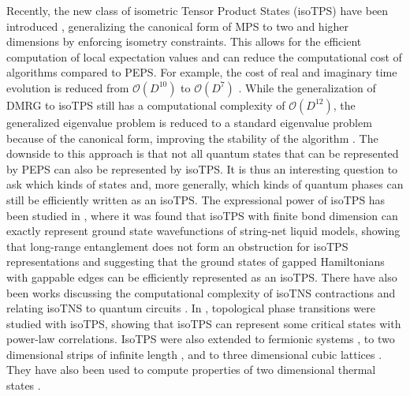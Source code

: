 Recently, the new class of isometric Tensor Product States (isoTPS) have been introduced \cite{cite:isometric_tensor_network_states_in_two_dimensions, cite:conversion_of_PEPS_into_a_canonical_form, cite:DMRG_approach_to_optimizing_2D_tensor_networks}, generalizing the canonical form of MPS to two and higher dimensions by enforcing isometry constraints. This allows for the efficient computation of local expectation values and can reduce the computational cost of algorithms compared to PEPS. For example, the cost of real and imaginary time evolution is reduced from $\mathcal{O}(D^{10})$ to $\mathcal{O}(D^7)$ \cite{cite:isometric_tensor_network_states_in_two_dimensions}. While the generalization of DMRG to isoTPS still has a computational complexity of $\mathcal{O}(D^{12})$, the generalized eigenvalue problem is reduced to a standard eigenvalue problem because of the canonical form, improving the stability of the algorithm \cite{cite:efficient_simulation_of_dynamics_in_two_dimensional_quantum_spin_systems}. The downside to this approach is that not all quantum states that can be represented by PEPS can also be represented by isoTPS. It is thus an interesting question to ask which kinds of states and, more generally, which kinds of quantum phases can still be efficiently written as an isoTPS. The expressional power of isoTPS has been studied in \cite{cite:isometric_tensor_network_representation_of_string_net_liquids}, where it was found that isoTPS with finite bond dimension can exactly represent ground state wavefunctions of string-net liquid models, showing that long-range entanglement does not form an obstruction for isoTPS representations and suggesting that the ground states of gapped Hamiltonians with gappable edges can be efficiently represented as an isoTPS. There have also been works discussing the computational complexity of isoTNS contractions \cite{cite:computational_complexity_of_isometric_tensor_network_states} and relating isoTNS to quantum circuits \cite{cite:sequential_generation_of_projected_entangled_pair_states, cite:quantum_circuits_for_2D_isometric_tensor_networks}. In \cite{cite:topological_quantum_phase_transitions_in_2D_isometric_tensor_networks}, topological phase transitions were studied with isoTPS, showing that isoTPS can represent some critical states with power-law correlations. IsoTPS were also extended to fermionic systems \cite{cite:fermionic_isometric_tensor_network_states}, to two dimensional strips of infinite length \cite{cite:two_dimensional_isometric_tensor_networks_on_infinite_strip}, and to three dimensional cubic lattices \cite{cite:three_dimensional_isometric_tensor_networks}. They have also been used to compute properties of two dimensional thermal states \cite{cite:isometric_tensor_network_representation_of_2D_thermal_states}. \par
